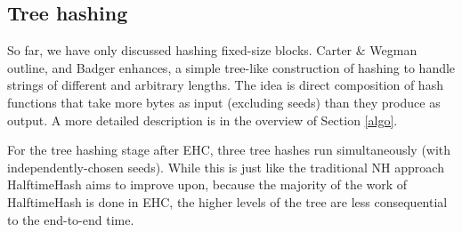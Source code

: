 \documentclass[acmsmall, nonacm]{acmart}
\begin{document}

\subsection{Tree hashing}

So far, we have only discussed hashing fixed-size blocks.
Carter \& Wegman outline, and Badger enhances, a simple tree-like construction of hashing to handle strings of different and arbitrary lengths. \cite{badger,carter-wegman-79}
The idea is direct composition of hash functions that take more bytes as input (excluding seeds) than they produce as output.
A more detailed description is in the overview of Section \ref{algo}.

For the tree hashing stage after EHC, three tree hashes run simultaneously (with independently-chosen seeds).
While this is just like the traditional NH approach HalftimeHash aims to improve upon, because the majority of the work of HalftimeHash is done in EHC, the higher levels of the tree are less consequential to the end-to-end time.







\end{document}
